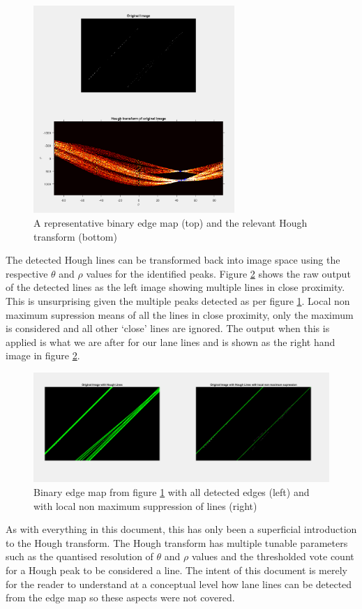 \documentclass{article}
\begin{document}
	\begin{figure}
		\centering
		\includegraphics[width=3.0in]{HoughDemoInput}
		\caption{A representative binary edge map (top) and the relevant Hough transform (bottom)}
		\label{HoughDemoInput}
	\end{figure}

	
	The detected Hough lines can be transformed back into image space using the respective $\theta$ and $\rho$ values for the identified peaks. Figure \ref{HoughDemoOutput} shows the raw output of the detected lines as the left image showing multiple lines in close proximity. This is unsurprising given the multiple peaks detected as per figure \ref{HoughDemoInput}. Local non maximum supression means of all the lines in close proximity, only the maximum is considered and all other `close' lines are ignored. The output when this is applied is what we are after for our lane lines and is shown as the right hand image in figure \ref{HoughDemoOutput}.
	
	\begin{figure}
		\centering
		\includegraphics[width=5.0in]{HoughDemoOutput}
		\caption{Binary edge map from figure \ref{HoughDemoInput} with all detected edges (left) and with local non maximum suppression of lines (right)}
		\label{HoughDemoOutput}
	\end{figure}
	
	
	As with everything in this document, this has only been a superficial introduction to the Hough transform. The Hough transform has multiple tunable parameters such as the quantised resolution of $\theta$ and $\rho$ values and the thresholded vote count for a Hough peak to be considered a line. The intent of this document is merely for the reader to understand at a conceptual level how lane lines can be detected from the edge map so these aspects were not covered.
	
	
\end{document}
